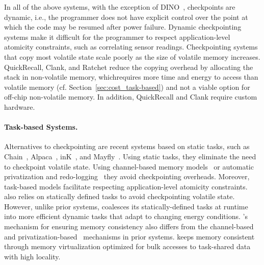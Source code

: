 In all of the above systems, with the exception of DINO~\cite{dino}, checkpoints are dynamic, i.e., the programmer does not have explicit control over the point at which the code may be resumed after power failure. Dynamic checkpointing systems make it difficult for the programmer to respect application-level atomicity constraints, such as correlating sensor readings. Checkpointing systems that copy most volatile state scale poorly as the size of volatile memory increases.  QuickRecall, Clank, and Ratchet reduce the copying overhead by allocating the stack in non-volatile memory, whichrequires more time and energy to access than volatile memory (cf. Section~\ref{sec:cost_task-based}) and not a viable option for off-chip non-volatile memory. In addition, QuickRecall and Clank require custom hardware. 

\paragraph{Task-based Systems.}
Alternatives to checkpointing are recent systems based on static tasks, such as Chain~\cite{chain}, Alpaca~\cite{alpaca}, inK~\cite{yildirim2018ink}, and Mayfly~\cite{hester_sensys_2017}. Using static tasks, they eliminate the need to checkpoint volatile state. Using channel-based memory models~\cite{chain,hester_sensys_2017} or automatic privatization and redo-logging~\cite{alpaca} they avoid checkpointing overheads. Moreover, task-based models facilitate respecting application-level atomicity constraints. \sys also relies on
statically defined tasks to avoid checkpointing volatile state. However, unlike prior systems, \sys coalesces its statically-defined tasks at runtime into more efficient dynamic tasks that adapt to changing energy conditions. \sys's mechanism for ensuring memory consistency also differs from the channel-based~\cite{chain} and privatization-based~\cite{alpaca} mechanisms in prior systems. \sys keeps memory consistent through memory virtualization optimized for bulk accesses to task-shared data with high locality.

